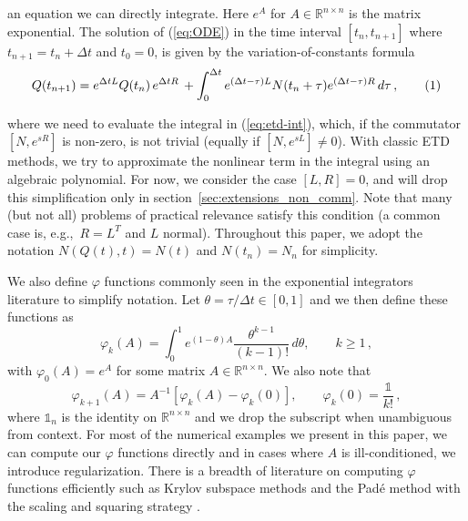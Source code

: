 \documentclass[12pt]{article}
\newcommand{\RR}{\mathds{R}}
\newcommand\numberthis{\addtocounter{equation}{1}\tag{\theequation}}
\begin{document}
an equation we can directly integrate. Here $e^{A}$ for $A \in \RR^{n\times n}$ is the matrix exponential. The solution of (\ref{eq:ODE}) in the time interval $[t_n,t_{n+1}]$ where $t_{n+1} = t_n + \Delta t$ and $t_0=0$, is given by the variation-of-constants formula  
\begin{equation}
  \label{eq:etd-int}
  Q(t_{n+1}) = e^{\Delta t L} Q(t_n)\, e^{\Delta t R} \, \nonumber + \int_0^{\Delta t} e^{(\Delta t-\tau) L} N(t_n + \tau) e^{(\Delta t-\tau) R}\,d\tau\,, \numberthis
\end{equation}


where  we need to evaluate the integral in (\ref{eq:etd-int}), which, if the commutator $[N,e^{sR}]$ is non-zero, is not trivial (equally if $[N,e^{sL}] \neq 0$). With classic ETD methods, we try to approximate the nonlinear term in the integral using an algebraic polynomial. For now, we consider the case $[L,R] = 0$, and will drop this simplification only in section~\ref{sec:extensions_non_comm}. Note that many (but not all) problems of practical relevance satisfy this condition (a common case is, e.g.,~$R=L^T$ and $L$ normal). Throughout this paper, we adopt the notation $N(Q(t),t) = N(t)$ and $N(t_n)=N_n$ for simplicity.

We also define $\varphi$ functions commonly seen in the exponential integrators literature \cite{LUAN2014168, hochbruck2010exponential} to simplify notation. Let $\theta = \tau / \Delta t \in [0,1]$ and we then define these functions as 
\begin{equation}
    \label{eq:varphi_def}
    \varphi_k(A) =\int_0^{1} e^{(1 - \theta)A} \frac{\theta^{k-1}}{(k-1)!}\, d\theta,  \qquad  k\geq 1 \, ,
\end{equation}
with $\varphi_0(A) = e^{A}$ for some matrix $A \in \RR^{n\times n}$. We also note that 
\begin{equation}
    \varphi_{k+1}(A) = A^{-1}[\varphi_k(A) - \varphi_k(0)], \qquad \varphi_k(0) = \frac{\mathds 1}{k!}\,,
\end{equation}
where $\mathds 1_n$ is the identity on $\RR^{n\times n}$ and we drop the subscript when unambiguous from context. For most of the numerical examples we present in this paper, we can compute our $\varphi$ functions directly and in cases where $A$ is ill-conditioned, we introduce regularization. There is a breadth of literature on computing $\varphi$ functions efficiently such as Krylov subspace methods \cite{Niesen_2012} and the Padé method with the scaling and squaring strategy \cite{AlMohy2009970}.
\end{document}
